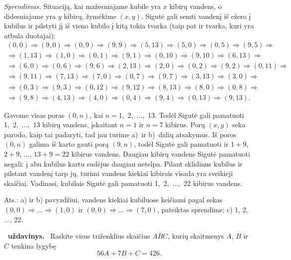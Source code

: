 \documentclass[11pt,a4paper]{article}
\newcounter{uzdavinys}
\newenvironment{uzdavinys}
  {\refstepcounter{uzdavinys}\par\medskip\noindent\textbf{\theuzdavinys\ uždavinys.}\ }
  {\par\medskip}
\begin{document}
\textit{Sprendimas.} 
Situaciją, kai mažesniajame kubile yra $x$ kibirų vandens, o didesniajame yra $y$ kibirų, žymėkime $(x,y)$.
Sigutė gali semti vandenį iš ežero į kubilus ir pilstyti jį iš vieno kubilo į kitą tokia tvarka (taip pat ir tvarka, kuri yra atbula duotajai):
\begin{gather*}(0,0)\Rightarrow(9,0)\Rightarrow(0,9)\Rightarrow(9,9)\Rightarrow(5,13)\Rightarrow(5,0)\Rightarrow(0,5)\Rightarrow(9,5)\Rightarrow\\
\Rightarrow(1,13)\Rightarrow(1,0)\Rightarrow(0,1)\Rightarrow(9,1)\Rightarrow(0,10)\Rightarrow(9,10)\Rightarrow(6,13)\Rightarrow\\
\Rightarrow(6,0)\Rightarrow(0,6)\Rightarrow(9,6)\Rightarrow(2,13)\Rightarrow(2,0)\Rightarrow(0,2)\Rightarrow(9,2)\Rightarrow(0,11)\Rightarrow\\
\Rightarrow(9,11)\Rightarrow(7,13)\Rightarrow(7,0)\Rightarrow(0,7)\Rightarrow(9,7)\Rightarrow(3,13)\Rightarrow(3,0)\Rightarrow\\
\Rightarrow(0,3)\Rightarrow(9,3)\Rightarrow(0,12)\Rightarrow(9,12)\Rightarrow(8,13)\Rightarrow(8,0)\Rightarrow(0,8)\Rightarrow\\
\Rightarrow(9,8)\Rightarrow(4,13)\Rightarrow(4,0)\Rightarrow(0,4)\Rightarrow(9,4)\Rightarrow(0,13)\Rightarrow(9,13).\end{gather*}

Gavome visas poras $(0, n)$, kai $n=1$,~2,~$\ldots$,~13. Todėl Sigutė gali pamatuoti 1,~2,~$\ldots$,~13 kibirų vandens, įskaitant $n=1$ ir $n=7$ kibirus. Porų $(x, y)$ seka parodo, kaip tai padaryti, tad jau turime a)~ir b)~dalių atsakymus. Iš poros $(0, n)$ galima iš karto gauti porą $(9, n)$, todėl Sigutė gali pamatuoti ir $1+9$, $2+9$, $\ldots$, $13+9=22$ kibirus vandens. Daugiau kibirų vandens Sigutė pamatuoti negali: į abu kubilus kartu sudėjus daugiau netelpa. Pilant sklidinus kubilus ir pilstant vandenį tarp jų, turimi vandens kiekiai kibirais visada yra sveikieji skaičiai. Vadinasi, kubilais Sigutė gali pamatuoti 1,~2,~$\ldots$,~22 kibirus vandens.
\begin{flushright}
     Ats.: a) ir b) pavyzdžiui, vandens kiekiai kubiluose keičiami pagal sekas $(0, 0)\Rightarrow\ldots\Rightarrow(1, 0)$ ir $(0, 0)\Rightarrow\ldots\Rightarrow(7, 0)$, pateiktas sprendime; c) 1, 2, $\ldots$, 22.
    \end{flushright}
\vspace{3mm}

\begin{uzdavinys}
Raskite visus triženklius skaičius $\overline{ABC}$, kurių 
skaitmenys $A$, $B$ ir $C$ tenkina lygybę 
\[
56A+7B+C=426.
\]
\end{uzdavinys}
\end{document}
